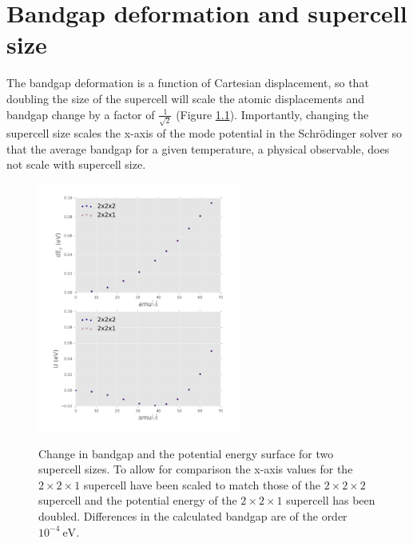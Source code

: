 \chapter{\label{app:6-SCcompare}Bandgap deformation and supercell size}

The bandgap deformation is a function of Cartesian displacement, so that doubling the size of the supercell will scale the atomic displacements and bandgap change by a factor of $\frac{1}{\sqrt{2}}$ (Figure \ref{ch5scaling}).  %
Importantly, changing the supercell size scales the x-axis of the mode potential in the Schr\"{o}dinger solver so that the average bandgap for a given temperature, a physical observable, does not scale with supercell size.

\begin{figure}[]
\includegraphics[width=0.6\textwidth]{figures/ch5/SCcompare.png} \label{ch5scaling}
\caption[Bandgap deformation and supercell size]{
Change in bandgap and the potential energy surface for two supercell sizes. To allow for comparison the x-axis values for the $2\times2\times1$ supercell have been scaled to match those of the $2\times2\times2$ supercell and the potential energy of the $2\times2\times1$ supercell has been doubled.  Differences in the calculated bandgap are of the order $10^{−4}\ \textrm{eV}$.
}
\end{figure}

